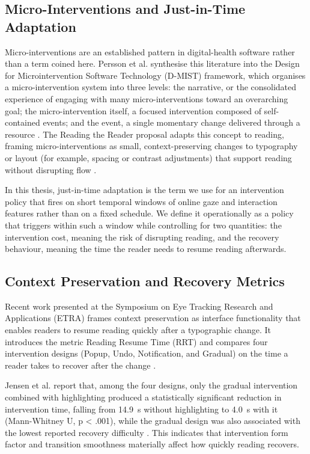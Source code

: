 \subsection{Micro-Interventions and Just-in-Time Adaptation}
\label{subsec:micro-interventions}
Micro-interventions are an established pattern in digital-health software rather than a term coined here.
Persson et al. synthesise this literature into the Design for Microintervention Software Technology (D-MIST) framework, which organises a micro-intervention system into three levels: the narrative, or the consolidated experience of engaging with many micro-interventions toward an overarching goal; the micro-intervention itself, a focused intervention composed of self-contained events; and the event, a single momentary change delivered through a resource \cite{persson2025microintervention}.
The Reading the Reader proposal adapts this concept to reading, framing micro-interventions as small, context-preserving changes to typography or layout (for example, spacing or contrast adjustments) that support reading without disrupting flow \cite{dtucompute2025rtr}.

In this thesis, just-in-time adaptation is the term we use for an intervention policy that fires on short temporal windows of online gaze and interaction features rather than on a fixed schedule.
We define it operationally as a policy that triggers within such a window while controlling for two quantities: the intervention cost, meaning the risk of disrupting reading, and the recovery behaviour, meaning the time the reader needs to resume reading afterwards.

\subsection{Context Preservation and Recovery Metrics}
\label{subsec:context-preservation}
Recent work presented at the Symposium on Eye Tracking Research and Applications (ETRA) frames context preservation as interface functionality that enables readers to resume reading quickly after a typographic change.
It introduces the metric Reading Resume Time (RRT) and compares four intervention designs (Popup, Undo, Notification, and Gradual) on the time a reader takes to recover after the change \cite{jensen2025context}.

Jensen et al. report that, among the four designs, only the gradual intervention combined with highlighting produced a statistically significant reduction in intervention time, falling from 14.9~s without highlighting to 4.0~s with it (Mann-Whitney U, p < .001), while the gradual design was also associated with the lowest reported recovery difficulty \cite{jensen2025context}.
This indicates that intervention form factor and transition smoothness materially affect how quickly reading recovers.

